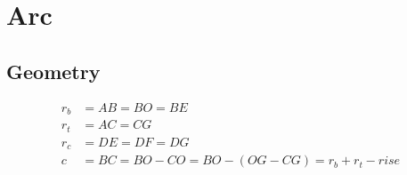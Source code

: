 \section{Arc}

\subsection{Geometry}

\begin{equation}
\begin{aligned}
r_b & = AB = BO = BE \\
r_t & = AC = CG \\
r_c & = DE = DF = DG \\
c & = BC =BO - CO = BO - (OG - CG) =  r_b + r_t - rise \\
\end{aligned}
\end{equation}

